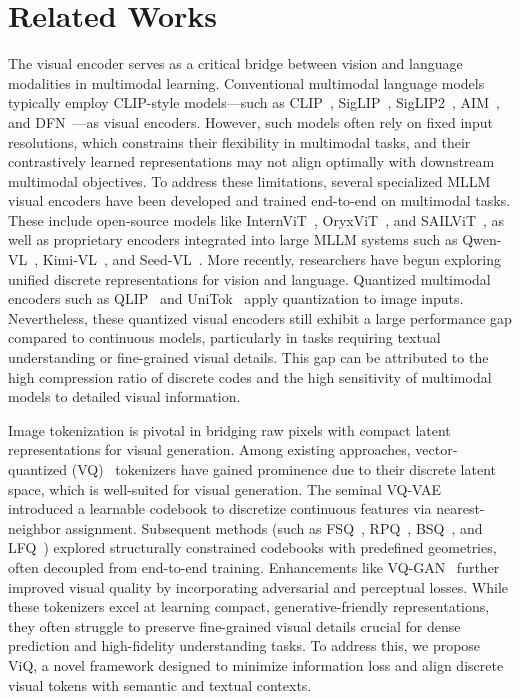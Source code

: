 \section{Related Works}
\label{sec:related_works}

The visual encoder serves as a critical bridge between vision and language modalities in multimodal learning. Conventional multimodal language models typically employ CLIP-style models—such as CLIP~\cite{radford2021clip}, SigLIP~\cite{zhai2023siglip}, SigLIP2~\cite{tschannen2025siglip}, AIM~\cite{fini2025multimodal}, and DFN~\cite{fang2023dfn}—as visual encoders. However, such models often rely on fixed input resolutions, which constrains their flexibility in multimodal tasks, and their contrastively learned representations may not align optimally with downstream multimodal objectives. To address these limitations, several specialized MLLM visual encoders have been developed and trained end-to-end on multimodal tasks. These include open-source models like InternViT~\cite{chen2024internvl,zhu2025internvl3}, OryxViT~\cite{liu2024oryx}, and SAILViT~\cite{yin2025sail}, as well as proprietary encoders integrated into large MLLM systems such as Qwen-VL~\cite{Qwen2.5-VL}, Kimi-VL~\cite{team2025kimi}, and Seed-VL~\cite{guo2025seed1}. More recently, researchers have begun exploring unified discrete representations for vision and language. Quantized multimodal encoders such as QLIP~\cite{zhao2025qlip} and UniTok~\cite{ma2025unitok} apply quantization to image inputs. Nevertheless, these quantized visual encoders still exhibit a large performance gap compared to continuous models, particularly in tasks requiring textual understanding or fine-grained visual details. This gap can be attributed to the high compression ratio of discrete codes and the high sensitivity of multimodal models to detailed visual information.

 Image tokenization is pivotal in bridging raw pixels with compact latent representations for visual generation. Among existing approaches, vector-quantized (VQ)~\cite{gersho2012vector} tokenizers have gained prominence due to their discrete latent space, which is well-suited for visual generation. The seminal VQ-VAE~\cite{van2017neural} introduced a learnable codebook to discretize continuous features via nearest-neighbor assignment. Subsequent methods (such as FSQ~\cite{mentzerfinite}, RPQ~\cite{chiu2022self}, BSQ~\cite{zhaoimage}, and LFQ~\cite{yulanguage}) explored structurally constrained codebooks with predefined geometries, often decoupled from end-to-end training. Enhancements like VQ-GAN~\cite{esser2021taming} further improved visual quality by incorporating adversarial and perceptual losses. While these tokenizers excel at learning compact, generative-friendly representations, they often struggle to preserve fine-grained visual details crucial for dense prediction and high-fidelity understanding tasks. To address this, we propose ViQ, a novel framework designed to minimize information loss and align discrete visual tokens with semantic and textual contexts.
